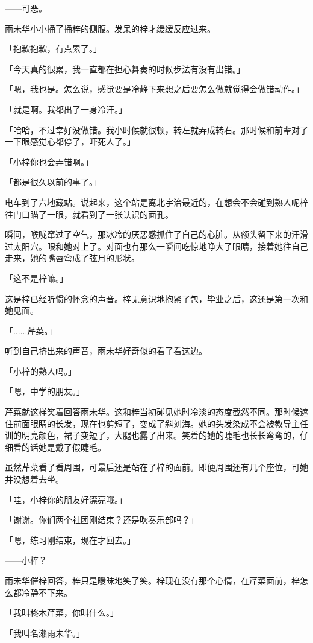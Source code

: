 \documentclass[UTF8]{ctexart}
\begin{document}
    ——可恶。

    雨未华小小捅了捅梓的侧腹。发呆的梓才缓缓反应过来。

    「抱歉抱歉，有点累了。」

    「今天真的很累，我一直都在担心舞奏的时候步法有没有出错。」

    「嗯，我也是。怎么说，感觉要是冷静下来想之后要怎么做就觉得会做错动作。」

    「就是啊。我都出了一身冷汗。」

    「哈哈，不过幸好没做错。我小时候就很顿，转左就弄成转右。那时候和前辈对了一下眼感觉心都停了，吓死人了。」

    「小梓你也会弄错啊。」

    「都是很久以前的事了。」

    电车到了六地藏站。说起来，这个站是离北宇治最近的，在想会不会碰到熟人呢梓往门口瞄了一眼，就看到了一张认识的面孔。

    瞬间，喉咙窜过了空气，那冰冷的厌恶感抓住了自己的心脏。从额头留下来的汗滑过太阳穴。眼和她对上了。对面也有那么一瞬间吃惊地睁大了眼睛，接着她往自己走来，她的嘴唇弯成了弦月的形状。

    「这不是梓嘛。」

    这是梓已经听惯的怀念的声音。梓无意识地抱紧了包，毕业之后，这还是第一次和她见面。

    「......芹菜。」

    听到自己挤出来的声音，雨未华好奇似的看了看这边。

    「小梓的熟人吗。」

    「嗯，中学的朋友。」

    芹菜就这样笑着回答雨未华。这和梓当初碰见她时冷淡的态度截然不同。那时候遮住前面眼睛的长发，现在也剪短了，变成了斜刘海。她的头发染成不会被教导主任训的明亮颜色，裙子变短了，大腿也露了出来。笑着的她的睫毛也长长弯弯的，仔细看的话她是戴了假睫毛。

    虽然芹菜看了看周围，可最后还是站在了梓的面前。即便周围还有几个座位，可她并没想着去坐。

    「哇，小梓你的朋友好漂亮哦。」

    「谢谢。你们两个社团刚结束？还是吹奏乐部吗？」

    「嗯，练习刚结束，现在才回去。」

    ——小梓？

    雨未华催梓回答，梓只是暧昧地笑了笑。梓现在没有那个心情，在芹菜面前，梓怎么都冷静不下来。

    「我叫柊木芹菜，你叫什么。」

    「我叫名濑雨未华。」
\end{document}
